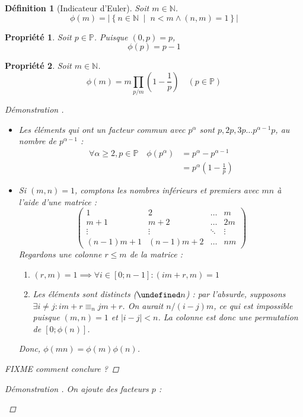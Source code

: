 \documentclass[11pt,twocolumn]{article}
\let\mod\undefined
\DeclareMathOperator{\mod}{mod}
\theoremstyle{plain}
\newtheorem{df}{Définition}
\newtheorem{pr}{Propriété}
\newcommand{\esP}{\mathbb{P}} %
\newcommand{\esN}{\mathbb{N}} %
\newenvironment{cproof}[1]{\begin{proof}[Démonstration \cite{#1}]}{\end{proof}}
\begin{document}
\begin{df}[Indicateur d'Euler] Soit $m \in \esN$. \[
	\phi(m) = \left|\left\{n \in \esN \; \middle| \;
	n < m \land (n,m)=1 \right\}\right|
\] \end{df}
\begin{pr} Soit $p \in \esP$. Puisque $(0,p)=p$, \[
		\phi(p)=p-1
\] \end{pr}
\begin{pr}
	Soit $m \in \esN$. \[
		\phi(m) = m \left.\prod_{p/m} \left(1 - \frac1p\right)\right.
		\quad (p \in \esP)
	\]
	\begin{cproof}{Buys} ~
		\begin{itemize}
			\item Les éléments qui ont un facteur commun avec $p^\alpha$ sont
				$p, 2p, 3p \dots p^{\alpha-1}p$, au nombre de $p^{\alpha-1}$ :
				\begin{align*}
					\forall \alpha \geq 2, p \in \esP \quad
					\phi\left(p^\alpha\right)
					&= p^\alpha - p^{\alpha-1} \\
					&= p^\alpha\left(1-\frac1p\right)
				\end{align*}
			\item Si $(m,n)=1$, comptons les nombres
				inférieurs et premiers avec $mn$ à l'aide d'une matrice : \[
					\left(\begin{array}{llll}
						1 & 2 & \dots & m \\
						m+1 & m+2 & \dots & 2m \\
						\vdots & \vdots & \ddots & \vdots \\
						(n-1)m+1 & (n-1)m+2 & \dots & nm
					\end{array}\right)
				\]
				Regardons une colonne $r \leq m$ de la matrice :
				\begin{enumerate}
					\item $(r,m)=1 \implies \forall i \in [0;n-1] : (im+r,m)=1$
					\item Les éléments sont distincts ($\mod n$) :
						par l'absurde,
						supposons $\exists i \neq j : im+r \equiv_n jm+r$.
						On aurait $n/\left(i-j\right)m$, ce qui est impossible
						puisque $(m,n)=1$ et $\left|i-j\right|<n$.
						La colonne est donc une permutation de $[0;\phi(n)]$.
				\end{enumerate}
				Donc, $\phi(mn)=\phi(m)\phi(n)$.
		\end{itemize}
		FIXME comment conclure ?
	\end{cproof}
	\begin{cproof}{Buys}
		On ajoute des facteurs $p$ :
		\begin{itemize}

\end{itemize}
\end{cproof}
\end{pr}
\end{document}
